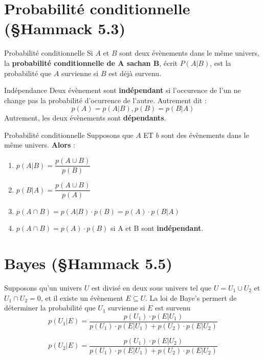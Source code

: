 \documentclass[8pt]{report}
\begin{document}
\begin{multicols*}{2}
        
        \section{Probabilité conditionnelle (\S Hammack 5.3)}

        
        \begin{Definitionx}{Probabilité conditionnelle}{}
            Si $A$ et $B$ sont deux évènements dans le même univers, la 
            \textbf{probabilité conditionnelle de A sachan B}, écrit $P(A|B)$, est la probabilité 
            que $A$ survienne si $B$ est déjà survenu. 
        \end{Definitionx}


    \begin{Definitionx}{Indépendance}{}
        Deux évènement sont \textbf{indépendant} si l'occurence de l'un ne change pas la probabilité 
        d'ocurrence de l'autre. Autrement dit :
        \[ p(A) = p(A|B), p(B) = p(B|A) \]
        Autrement, les deux évènements sont \textbf{dépendants}.   
    \end{Definitionx}


    \begin{Concept}{Probabilité conditionnelle}{}
        Supposons que $A$ ET $b$ sont des évènements dans le même univers. \textbf{Alors} : 
        \begin{enumerate}
            \item $p(A|B) = \dfrac{p(A \cup B)}{p(B)}$
            \item $p(B|A) = \dfrac{p(A \cup B)}{p(A)}$
            \item $p(A \cap B) = p(A|B)\cdot p(B) = p(A)\cdot p(B|A)$ 
            \item $p(A \cap B) = p(A)\cdot p(B)$ \dotfill si A et B sont \textbf{indépendant}.   
        \end{enumerate}
    \end{Concept}

    \section{Bayes (\S Hammack 5.5)}
    Supposons qu'un univers $U$ est divisé en deux sous univers tel que $U = U_1 \cup U_2$
    et $U_1 \cap U_2 = 0$, et il existe un évènement $E \subseteq U$. 
    La loi de Baye's permert de déterminer la probabilité que $U_1$ survienne si $E$ est survenu 
    \[ p(U_1|E)= \dfrac{p(U_1)\cdot p(E|U_1)}{p(U_1)\cdot p(E|U_1)+p(U_2)\cdot p(E|U_2)}\]

    \[ p(U_2|E)= \dfrac{p(U_1)\cdot p(E|U_2)}{p(U_1)\cdot p(E|U_1)+p(U_2)\cdot p(E|U_2)}\]

\end{multicols*}
\end{document}
